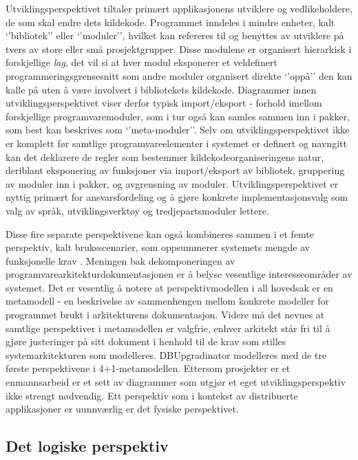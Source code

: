 Utviklingsperspektivet tiltaler primært applikasjonens utviklere og vedlikeholdere, de som skal endre dets kildekode. Programmet inndeles i mindre enheter, kalt ‘’bibliotek’’ eller ‘’moduler’’, hvilket kan refereres til og benyttes av utviklere på tvers av store eller små prosjektgrupper. Disse modulene er organisert hierarkisk i forskjellige \emph{lag}, det vil si at hver modul eksponerer et veldefinert programmeringsgrensesnitt som andre moduler organisert direkte ‘’oppå’’ den kan kalle på uten å være involvert i bibliotekets kildekode. Diagrammer innen utviklingsperspektivet viser derfor typisk import/eksport - forhold imellom forskjellige programvaremoduler, som i tur også kan samles sammen inn i pakker, som best kan beskrives som ‘’meta-moduler’’. Selv om utviklingsperspektivet ikke er komplett før samtlige programvareelementer i systemet er definert og navngitt kan det deklarere de regler som bestemmer kildekodeorganiseringens natur, deriblant eksponering av funksjoner via import/eksport av bibliotek, gruppering av moduler inn i pakker, og avgrensning av moduler. Utviklingsperspektivet er nyttig primært for ansvarsfordeling og å gjøre konkrete implementasjonsvalg som valg av språk, utviklingsverktøy og tredjepartsmoduler lettere.

Disse fire separate perspektivene kan også kombineres sammen i et femte perspektiv, kalt bruksscenarier, som oppsummerer systemets mengde av funksjonelle krav \citep{kruchten1995}. Meningen bak dekomponeringen av programvarearkitekturdokumentasjonen er å belyse vesentlige interesseområder av systemet. Det er vesentlig å notere at perspektivmodellen i all hovedsak er en metamodell - en beskrivelse av sammenhengen mellom konkrete modeller for programmet brukt i arkitekturens dokumentasjon. Videre må det nevnes at samtlige perspektiver i metamodellen er valgfrie, enhver arkitekt står fri til å gjøre justeringer på sitt dokument i henhold til de krav som stilles systemarkitekturen som modelleres. DBUpgradinator modelleres med de tre første perspektivene i 4+1-metamodellen. Ettersom prosjekter er et enmannsarbeid er et sett av diagrammer som utgjør et eget utviklingsperspektiv ikke strengt nødvendig. Ett perspektiv som i kontekst av distribuerte applikasjoner er uunnværlig er det fysiske perspektivet.

\subsection{Det logiske perspektiv}


